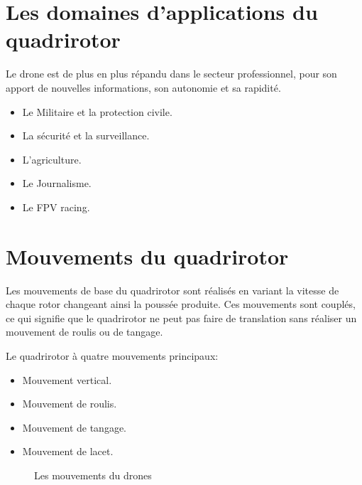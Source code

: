 \documentclass[a4paper,12pt]{report}
\begin{document}
	\section{Les domaines d'applications du quadrirotor}
	
	Le drone est de plus en plus répandu dans le secteur professionnel, pour son apport de nouvelles informations, son autonomie et sa rapidité.
	
	\begin{itemize}
		
		\item Le Militaire et la protection civile.
		\item La sécurité et la surveillance.
		\item L'agriculture.
		\item Le Journalisme.
		\item Le FPV racing.
		
	\end{itemize}
	\newpage
	\section{Mouvements du quadrirotor}
	Les mouvements de base du quadrirotor sont réalisés en variant la vitesse de chaque rotor changeant ainsi la poussée produite. Ces mouvements sont couplés, ce qui signifie que le quadrirotor ne peut pas faire de translation sans réaliser un mouvement de roulis  ou de tangage.
	
	Le quadrirotor à quatre mouvements principaux:		
	\begin{itemize}
		\item Mouvement vertical.
		\item Mouvement de roulis.
		\item Mouvement de tangage.
		\item Mouvement de lacet.
	\end{itemize}
	\begin{figure} [h]
	\begin{center}
		\centering
	\end{center}
	\caption{Les mouvements du drones }
	\end{figure}
\end{document}
